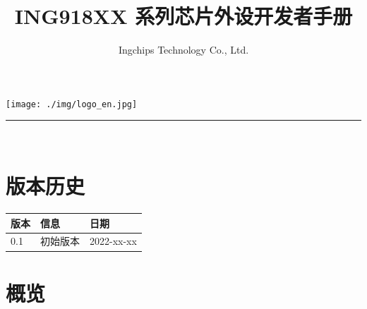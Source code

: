 \documentclass[
  12pt,
]{book}
\title{ING918XX 系列芯片外设开发者手册}
\author{Ingchips Technology Co., Ltd.}
\date{}
\let\oldmaketitle\maketitle
\begin{document}
\maketitle

\thispagestyle{empty}
\begin{center}
\end{center}

\setlength{\abovedisplayskip}{-5pt}
\setlength{\abovedisplayshortskip}{-5pt}

\thispagestyle{empty}

\makeatletter
\begin{center}
    \vspace{5ex}
    \texttt{[image: ./img/logo\_en.jpg]}\\[15ex]
    {\huge  \@title }
    \noindent\rule{10cm}{0.4pt}\\[68ex]
    {\large \@author}
\end{center}
\makeatother


\newpage
\thispagestyle{empty}


{
\setcounter{tocdepth}{3}
\tableofcontents
}
\listoftables
\listoffigures
\mainmatter

\hypertarget{revision-history}{%
\chapter{版本历史}\label{revision-history}}

\begin{longtable}[]{@{}lll@{}}
\toprule
版本 & 信息 & 日期\tabularnewline
\midrule
\endhead
0.1 & 初始版本 & 2022-xx-xx\tabularnewline
\bottomrule
\end{longtable}

\hypertarget{ch-overview}{%
\chapter{概览}\label{ch-overview}}
\end{document}
